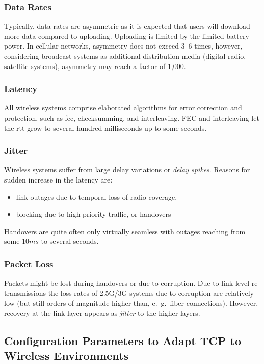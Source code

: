 \subsubsection{Data Rates}
Typically, data rates are asymmetric as it is expected that users will download more data compared to uploading. Uploading is limited by the limited battery power. In cellular networks, asymmetry does not exceed 3–6 times, however, considering broadcast systems as additional distribution media (digital radio, satellite systems), asymmetry may reach a factor of 1,000.

\subsubsection{Latency}
All wireless systems comprise elaborated algorithms for error correction and protection, such as \gls{fec}, checksumming, and interleaving. FEC and interleaving let the \gls{rtt} grow to several hundred milliseconds up to some seconds.


\subsubsection{Jitter}
Wireless systems suffer from large delay variations or \textit{delay spikes}. Reasons for sudden increase in the latency are: 
\begin{itemize}
	\item link outages due to temporal loss of radio coverage,
	\item blocking due to high-priority traffic, or handovers
\end{itemize}

Handovers are quite often only virtually seamless with outages reaching from some $ 10 ms $ to several seconds.

\subsubsection{Packet Loss}
Packets might be lost during handovers or due to corruption. Due to link-level re-transmissions the loss rates of 2.5G/3G systems due to corruption are relatively low (but still orders of magnitude higher than, e.\ g.\, fiber connections). However, recovery at the link layer appears as \textit{jitter} to the higher layers.


\subsection[Configuration Parameters]{Configuration Parameters to Adapt TCP to Wireless Environments}


